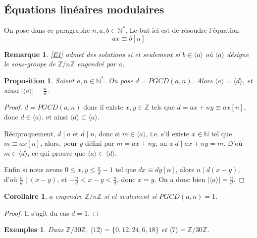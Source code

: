 \documentclass[10pt,a4paper]{report}
\newtheorem*{exs}{Exemples}
\newtheorem*{rem}{Remarque}
\newtheorem{Prop}[thm]{Proposition}
\newtheorem{Cor}[thm]{Corollaire}
\begin{document}
\subsection{Équations linéaires modulaires}

On pose dans ce paragraphe $n,a,b \in \mathbb{N}^*$. Le but ici est de résoudre l'équation 
\begin{equation}\label{E1}
ax \equiv b [n]
\end{equation}

\begin{rem}
\eqref{E1} admet des solutions si et seulement si $b \in \langle a \rangle$ où $\langle a \rangle $ désigne le sous-groupe de $\mathbb{Z}/n\mathbb{Z}$ engendré par $a$.
\end{rem}


\begin{Prop}
Soient $a,n \in \mathbb{N}^*$. On pose $d=PGCD(a,n)$. Alors $\langle a \rangle= \langle d \rangle$, et ainsi $| \langle a \rangle | = \tfrac{n}{d}$.
\end{Prop}

\begin{proof}
$d=PGCD(a,n)$ donc il existe $x,y \in \mathbb{Z}$ tels que $d=ax+ny \equiv ax [n]$, donc $d \in \langle a \rangle$, et ainsi $\langle d \rangle \subset \langle a \rangle $.\par 
Réciproquement, $d \mid a $ et $d \mid n$, donc si $m \in \langle a \rangle $, i.e. s'il existe $x \in \mathbb{N}$ tel que $m \equiv ax [n]$, alors, pour $y$ défini par $m=ax+ny$, on a $d \mid ax+ny=m$. D'où $m \in \langle d \rangle $, ce qui prouve que $\langle a \rangle \subset \langle d \rangle $.\par 
Enfin si nous avons $0 \leqslant x,y \leqslant \tfrac{n}{d}-1$ tel que $dx \equiv dy [n]$, alors $n \mid d(x-y)$, d'où $\tfrac{n}{d}\mid (x-y)$, et $-\tfrac{n}{d}< x-y < \tfrac{n}{d}$, donc $x=y$. On a donc bien $| \langle a \rangle | = \tfrac{n}{d}$.
\end{proof}


\begin{Cor}
$a$ engendre $\mathbb{Z}/n\mathbb{Z}$ si et seulement si $PGCD(a,n)=1$.
\end{Cor}

\begin{proof}
Il s'agit du cas $d=1$.
\end{proof}

\begin{exs}
Dans $\mathbb{Z}/30\mathbb{Z}$, $\langle 12 \rangle = \{ 0,12,24,6,18 \}$ et $\langle 7 \rangle = \mathbb{Z}/30 \mathbb{Z}$.
\end{exs}
\end{document}
